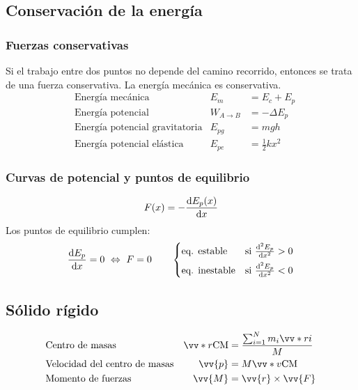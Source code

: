 \documentclass[a4paper, 8pt]{extarticle}
\renewcommand{\vec}[1]{\vv{{#1}}}
\begin{document}
\begin{multicols}{3}
  \subsection{Conservación de la energía}
  \subsubsection{Fuerzas conservativas}
  Si el trabajo entre dos puntos no depende del camino recorrido, entonces se trata de una fuerza conservativa. La energía mecánica es conservativa.
  \begin{align*}
     & \text{Energía mecánica}               & E_m        & = E_c + E_p       \\
     & \text{Energía potencial}              & W_{A\to B} & = -\Delta E_p     \\
     & \text{Energía potencial gravitatoria} & E_{pg}     & = mgh             \\
     & \text{Energía potencial elástica}     & E_{pe}     & = \frac{1}{2}kx^2
  \end{align*}
  \subsubsection{Curvas de potencial y puntos de equilibrio}
  \[ F(x) = - \dv{E_p(x)}{x} \]
  Los puntos de equilibrio cumplen:
  \[ \dv{E_p}{x} = 0 \ \Leftrightarrow \ F = 0 \qquad \left\lbrace
    \begin{matrix*}[l]
      \text{eq. estable}   & \text{si }\dv[2]{E_p}{x}>0\\[5pt]
      \text{eq. inestable} & \text{si }\dv[2]{E_p}{x}<0
    \end{matrix*} \right.\]

  \subsection{Sólido rígido}
  \begin{align*}
     & \text{Centro de masas}               & \vv*{r}{\text{CM}} & = \frac{\sum_{i=1}^{N}m_i \vv*{r}{i}}{M} \\
     & \text{Velocidad del centro de masas} & \vec{p}            & = M \vv*{v}{\text{CM}}                   \\
     & \text{Momento de fuerzas}            & \vec{M}            & = \vec{r} \times \vec{F}                 \\
  \end{align*}


\end{multicols}
\end{document}
